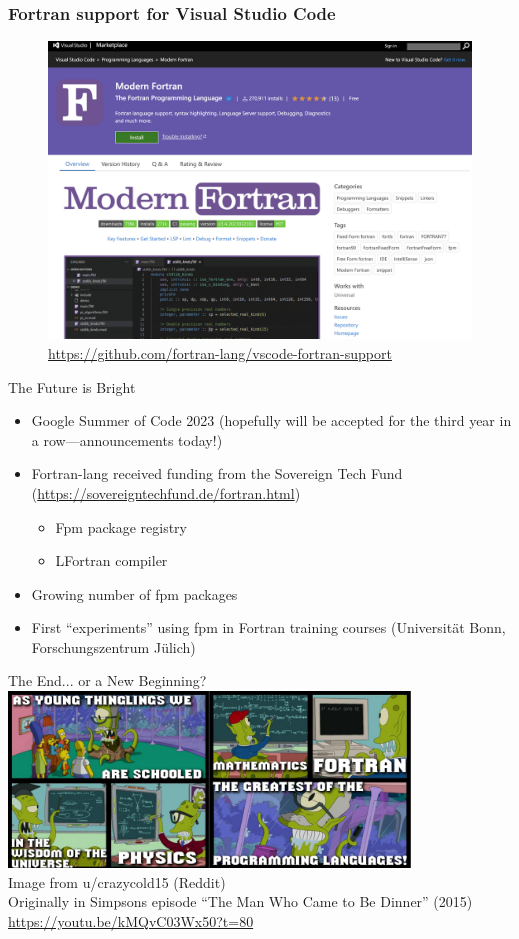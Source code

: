 \documentclass[aspectratio=169]{beamer}
\begin{document}
\begin{frame}
\frametitle{Fortran support for Visual Studio Code}
    \begin{figure}
        \includegraphics[width=.9\textwidth]{vscode_fortran}
        \url{https://github.com/fortran-lang/vscode-fortran-support}
    \end{figure}
\end{frame}


\begin{frame}{The Future is Bright}
\begin{itemize}
\item Google Summer of Code 2023 (hopefully will be accepted for the third year in a row---announcements today!)
\item Fortran-lang received funding from the Sovereign Tech Fund (\url{https://sovereigntechfund.de/fortran.html})
\begin{itemize}
    \item Fpm package registry
    \item LFortran compiler
\end{itemize}
\item Growing number of fpm packages
\item First ``experiments'' using fpm in Fortran training courses (Universität Bonn, Forschungszentrum Jülich)
\end{itemize}
\end{frame}

\begin{frame}{The End... or a New Beginning?}
    \centering
    \includegraphics[width=0.8\textwidth]{simpson_horizontal}\\
    \vspace{2mm}
    {\footnotesize Image from u/crazycold15 (Reddit)\\ Originally in Simpsons episode ``The Man Who Came to Be Dinner'' (2015) \\ \url{https://youtu.be/kMQvC03Wx50?t=80}}
\end{frame}
\end{document}
